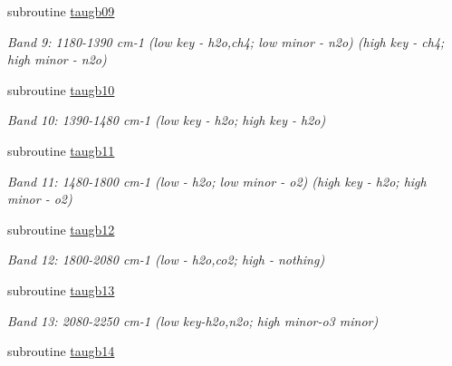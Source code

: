 \begin{DoxyCompactItemize}
subroutine \hyperlink{radlw__main_8f_a889abbaaa2d421c0c3dc820e2004414d}{taugb09}
\begin{DoxyCompactList}\small\item\em Band 9\+: 1180-\/1390 cm-\/1 (low key -\/ h2o,ch4; low minor -\/ n2o) (high key -\/ ch4; high minor -\/ n2o) \end{DoxyCompactList}\item 
\mbox{\label{radlw__main_8f_a74c1cb8390daff1e5ce5e863c50b7873}} 
subroutine \hyperlink{radlw__main_8f_a74c1cb8390daff1e5ce5e863c50b7873}{taugb10}
\begin{DoxyCompactList}\small\item\em Band 10\+: 1390-\/1480 cm-\/1 (low key -\/ h2o; high key -\/ h2o) \end{DoxyCompactList}\item 
\mbox{\label{radlw__main_8f_a573fd5b3580d6bbf5bfa2f01ee547034}} 
subroutine \hyperlink{radlw__main_8f_a573fd5b3580d6bbf5bfa2f01ee547034}{taugb11}
\begin{DoxyCompactList}\small\item\em Band 11\+: 1480-\/1800 cm-\/1 (low -\/ h2o; low minor -\/ o2) (high key -\/ h2o; high minor -\/ o2) \end{DoxyCompactList}\item 
\mbox{\label{radlw__main_8f_ae56eaa9e3b897ca235d4d6b271cc1e47}} 
subroutine \hyperlink{radlw__main_8f_ae56eaa9e3b897ca235d4d6b271cc1e47}{taugb12}
\begin{DoxyCompactList}\small\item\em Band 12\+: 1800-\/2080 cm-\/1 (low -\/ h2o,co2; high -\/ nothing) \end{DoxyCompactList}\item 
\mbox{\label{radlw__main_8f_a2ac7254d2dcff516e8e44b8b679302c0}} 
subroutine \hyperlink{radlw__main_8f_a2ac7254d2dcff516e8e44b8b679302c0}{taugb13}
\begin{DoxyCompactList}\small\item\em Band 13\+: 2080-\/2250 cm-\/1 (low key-\/h2o,n2o; high minor-\/o3 minor) \end{DoxyCompactList}\item 
\mbox{\label{radlw__main_8f_a26140cbe1a3d6119b56cf5c2d539670e}} 
subroutine \hyperlink{radlw__main_8f_a26140cbe1a3d6119b56cf5c2d539670e}{taugb14}

\end{DoxyCompactItemize}
